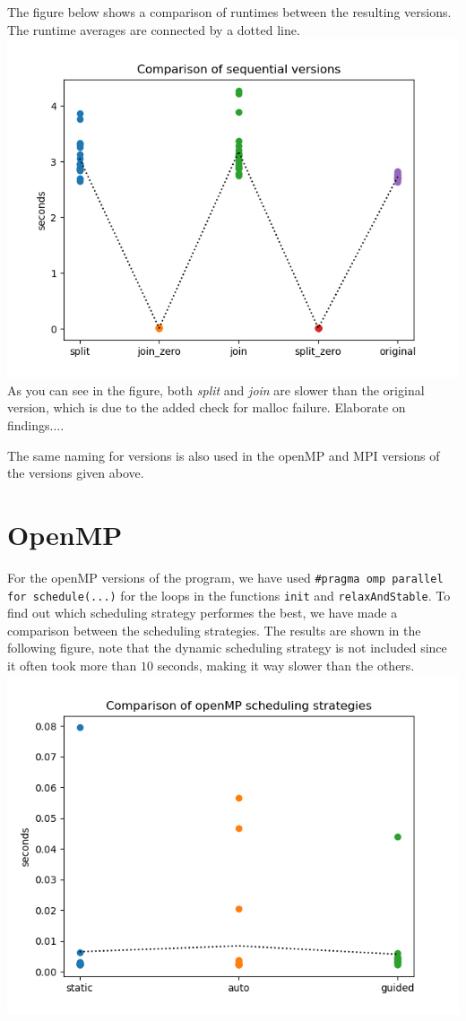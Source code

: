 \documentclass[a4paper]{article}
\begin{document}
The figure below shows a comparison of runtimes between the resulting versions. The runtime averages are connected by a dotted line.\\
\includegraphics[scale = 0.5]{graphs/Comparison of sequential versions.png}\\
As you can see in the figure, both \textit{split} and \textit{join} are slower than the original version, which is due to the added check for malloc failure. Elaborate on findings....

The same naming for versions is also used in the openMP and MPI versions of the versions given above.
\section{OpenMP}
For the openMP versions of the program, we have used \texttt{\#pragma omp parallel for schedule(...)} for the loops in the functions \texttt{init} and \texttt{relaxAndStable}. To find out which scheduling strategy performes the best, we have made a comparison between the scheduling strategies. The results are shown in the following figure, note that the dynamic scheduling strategy is not included since it often took more than $10$ seconds, making it way slower than the others.\\
\includegraphics[scale = 0.5]{graphs/Comparison of openMP scheduling strategies.png}
\end{document}
